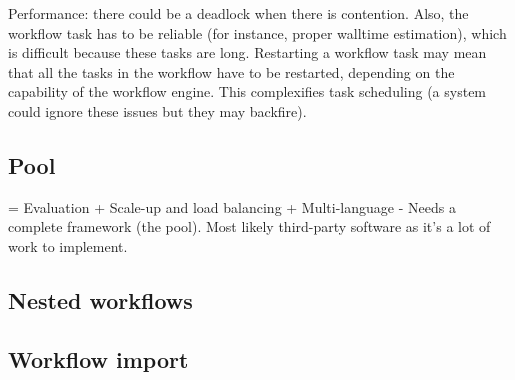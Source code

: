 \documentclass[preprint,3p,twocolumn]{elsarticle}
\begin{document}
Performance: there could be a deadlock when there is contention. Also,
the workflow task has to be reliable (for instance, proper walltime
estimation), which is difficult because these tasks are
long. Restarting a workflow task may mean that all the tasks in the
workflow have to be restarted, depending on the capability of the
workflow engine. This complexifies task scheduling (a system could
ignore these issues but they may backfire).


\subsection{Pool}

= Evaluation
+ Scale-up and load balancing
+ Multi-language
- Needs a complete framework (the pool). Most likely third-party software as it's a lot of work to implement.

\subsection{Nested workflows}

\subsection{Workflow import}
\end{document}
